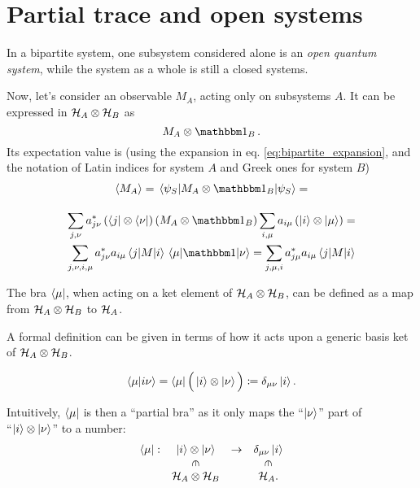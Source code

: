 \section{Partial trace and open systems}
\label{sec:p_tr}

In a bipartite system, one subsystem considered alone is an
\emph{open quantum system},
while the system as a whole is still a closed systems.

Now, let's consider an observable $M_A$, acting only on subsystems $A$.
It can be expressed in $\mathcal{H}_A \otimes \mathcal{H}_B$ as
\[
  M_A \otimes \idop_B\, .
\]
Its expectation value is
(using the expansion in eq. \eqref{eq:bipartite_expansion},
and the notation of Latin indices for system $A$ and Greek ones for system $B$)
\begin{multline}\label{eq:exp_subsys}
  \expval{M_A} = \matrixel{\psi_S}{M_A\otimes\idop_B}{\psi_S} = \\[1em]
  \sum_{j,\nu}a^{*}_{j\nu}\left(\bra{j}\otimes\bra{\nu}\right)\left(M_A\otimes\idop_B\right)\sum_{i,\mu}a_{i\mu}\left(\ket{i}\otimes\ket{\mu}\right) = \\
  \sum_{j,\nu,i,\mu}a^{*}_{j\nu}a_{i\mu}\matrixel{j}{M}{i}\matrixel{\mu}{\idop}{\nu} =
  \sum_{j,\mu,i}a^{*}_{j\mu}a_{i\mu}\matrixel{j}{M}{i}
\end{multline}

The bra $\bra{\mu}$, when acting on a ket element of $\mathcal{H}_{A} \otimes \mathcal{H}_{B}$,
can be defined
as a map from $\mathcal{H}_A\otimes\mathcal{H}_B$ to $\mathcal{H}_A$.

A formal definition can be given in terms of how it acts upon a generic
basis ket of $\mathcal{H}_A\otimes\mathcal{H}_B$.

\begin{definition}\label{def:pBra}
\[
  \braket{\mu}{i\nu} = \bra{\mu}\Big(\ket{i}\otimes\ket{\nu}\Big) \coloneqq \delta_{\mu\nu}\ket{i} \text{.}
\]
\end{definition}

Intuitively, $\bra{\mu}$ is then a ``partial bra''
as it only maps the ``$\ket{\nu}$'' part of\\
``$\ket{i}\otimes\ket{\nu}$''
to a number:
\[
  \begin{array}{cccc}
    \bra{\mu}:  & \ket{i}\ox\ket{\nu}                   & \rightarrow & \delta_{\mu\nu}\ket{i}                \\
                & \rotatebox[origin=c]{270}{$\in$}      &             & \rotatebox[origin=c]{270}{$\in$}      \\
                & \hilb{H}_A\ox\hilb{H}_B               &             & \hilb{H}_A   \text{.}
  \end{array}
\]

